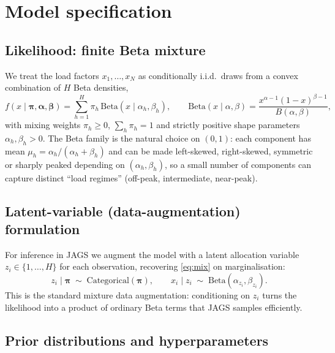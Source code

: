 \documentclass{article}
\begin{document}
\section{Model specification}

\subsection{Likelihood: finite Beta mixture}

We treat the load factors $x_1,\dots,x_N$ as conditionally i.i.d.\ draws
from a convex combination of $H$ Beta densities,
\begin{equation}
f(x\mid\bm\pi,\bm\alpha,\bm\beta)=\sum_{h=1}^{H}\pi_h\,
\mathrm{Beta}(x\mid\alpha_h,\beta_h),
\qquad
\mathrm{Beta}(x\mid\alpha,\beta)=\frac{x^{\alpha-1}(1-x)^{\beta-1}}{B(\alpha,\beta)},
\label{eq:mix}
\end{equation}
with mixing weights $\pi_h\ge 0$, $\sum_h\pi_h=1$ and strictly positive
shape parameters $\alpha_h,\beta_h>0$. The Beta family is the natural choice
on $(0,1)$: each component has mean $\mu_h=\alpha_h/(\alpha_h+\beta_h)$ and
can be made left-skewed, right-skewed, symmetric or sharply peaked depending
on $(\alpha_h,\beta_h)$, so a small number of components can capture distinct
``load regimes'' (off-peak, intermediate, near-peak).

\subsection{Latent-variable (data-augmentation) formulation}

For inference in JAGS we augment the model with a latent allocation variable
$z_i\in\{1,\dots,H\}$ for each observation, recovering \eqref{eq:mix} on
marginalisation:
\begin{equation}
z_i\mid\bm\pi\;\sim\;\mathrm{Categorical}(\bm\pi),
\qquad
x_i\mid z_i\;\sim\;\mathrm{Beta}(\alpha_{z_i},\beta_{z_i}).
\end{equation}
This is the standard mixture data augmentation: conditioning on $z_i$ turns
the likelihood into a product of ordinary Beta terms that JAGS samples
efficiently.

\subsection{Prior distributions and hyperparameters}
\end{document}
